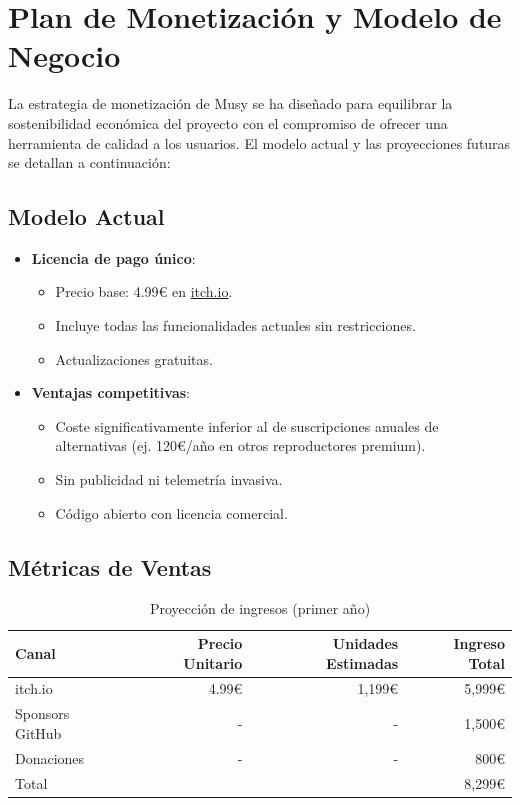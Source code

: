 \documentclass[11pt, a4paper]{article}
\begin{document}
\section{Plan de Monetización y Modelo de Negocio}

La estrategia de monetización de Musy se ha diseñado para equilibrar la sostenibilidad económica del proyecto con el compromiso de ofrecer una herramienta de calidad a los usuarios. El modelo actual y las proyecciones futuras se detallan a continuación:

  \subsection{Modelo Actual}

  \begin{itemize}
    \item \textbf{Licencia de pago único}:
      \begin{itemize}
        \item Precio base: 4.99€ en \href{https://zmiko.itch.io/musy}{itch.io}.
        \item Incluye todas las funcionalidades actuales sin restricciones.
        \item Actualizaciones gratuitas.
      \end{itemize} \newpage

    \item \textbf{Ventajas competitivas}:
      \begin{itemize}
        \item Coste significativamente inferior al de suscripciones anuales de alternativas (ej. 120€/año en otros reproductores premium).
        \item Sin publicidad ni telemetría invasiva.
        \item Código abierto con licencia comercial.
      \end{itemize}
  \end{itemize}

  \subsection{Métricas de Ventas}

  \begin{table}[h]
    \centering
    \caption{Proyección de ingresos (primer año)}
    \begin{tabular}{lrrr}
      \hline
      Canal & Precio Unitario & Unidades Estimadas & Ingreso Total \\
      \hline
      itch.io & 4.99€ & 1,199€ & 5,999€ \\
      Sponsors GitHub & - & - & 1,500€ \\
      Donaciones & - & - & 800€ \\
      \hline
      Total & & & 8,299€ \\
      \hline
    \end{tabular}
    \label{tab:ingresos}
  \end{table}
\end{document}
